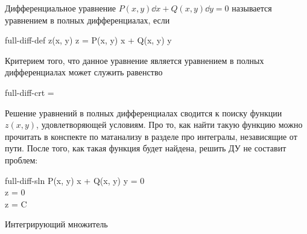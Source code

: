 
\begin{definition}
  Дифференциальное уравнение \(P(x, y) \dd x + Q(x, y) \dd y = 0\) называется
  уравнением в полных дифференциалах, если
  \begin{lequation}{full-diff-def}
    \exists z(x, y) \colon \dd z = P(x, y) \dd x + Q(x, y) \dd y
  \end{lequation}
\end{definition}

Критерием того, что данное уравнение является уравнением в полных
дифференциалах может служить равенство

\begin{lequation}{full-diff-crt}
   =  
\end{lequation}

Решение уравнений в полных дифференциалах сводится к поиску функции \(z(x, y)\),
удовлетворяющей условиям. Про то, как найти такую функцию можно прочитать в
конспекте по матанализу в разделе про интегралы, независящие от пути. После
того, как такая функция будет найдена, решить ДУ не составит проблем:

\begin{lequation}{full-diff-sln}
  P(x, y) \dd x + Q(x, y) \dd y = 0 \\
  \dd z = 0 \\
  z = C
\end{lequation}

\todo Интегрирующий множитель
